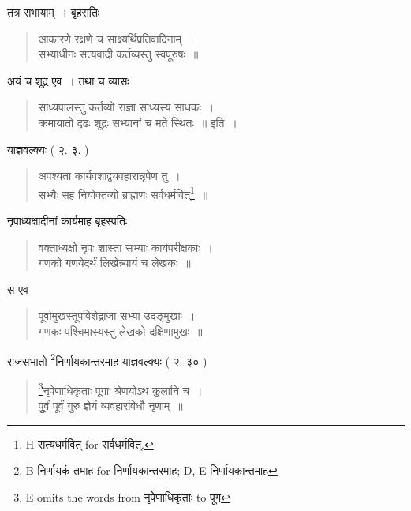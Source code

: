 \documentclass[11pt, openany]{book}
\begin{document}
तत्र सभायाम्~। बृहसतिः

\vspace{-2mm}
\begin{quote}
{\vy आकारणे रक्षणे च साक्ष्यर्थिप्रतिवादिनाम्~।\\
सभ्याधीनः सत्यवादी कर्तव्यस्तु स्वपूरुषः~॥}
\end{quote}

\newpage
{}

अयं च शूद्र एव~। तथा च व्यासः 

\vspace{-2mm}
\begin{quote}
{\vy साध्यपालस्तु कर्तव्यो राज्ञा साध्यस्य साधकः~।\\
क्रमायातो दृढः शूद्रः सभ्यानां च मते स्थितः~॥} इति~।
\end{quote}

याज्ञवल्क्यः ( २. ३. )

\vspace{-2mm}
\begin{quote}
{\vy अपश्यता कार्यवशाद्व्यवहारान्नृपेण तु~।\\
सभ्यैः सह नियोक्तव्यो ब्राह्मणः सर्वधर्मवित्\renewcommand{\thefootnote}{1}\footnote{H सत्यधर्मवित् for सर्वधर्मवित्.}~॥}
\end{quote}

नृपाध्यक्षादीनां कार्यमाह बृहस्पतिः 

\vspace{-2mm}
\begin{quote}
{\vy वक्ताध्यक्षो नृपः शास्ता सभ्याः कार्यपरीक्षकाः~।\\
गणको गणयेदर्थं लिखेन्न्यायं च लेखकः~॥}
\end{quote}

स एव

\vspace{-2mm}
\begin{quote}
{\vy पूर्वामुखस्तूपविशेद्राजा सभ्या उदङ्मुखाः~।\\
गणकः पश्चिमास्यस्तु लेखको दक्षिणामुखः~॥}
\end{quote}

राजसभातो \renewcommand{\thefootnote}{2}\footnote{B निर्णायकं तमाह for निर्णायकान्तरमाह; D, E निर्णायकान्तमाह}निर्णायकान्तरमाह याज्ञवल्क्यः ( २. ३० )

\vspace{-2mm}
\begin{quote}
{\vy \renewcommand{\thefootnote}{3}\footnote{E omits the words from नृपेणाधिकृताः to पूग}नृपेणाधिकृताः पूगाः श्रेणयोऽथ कुलानि च~।\\
पुुूर्वं पूर्वं गुरु ज्ञेयं व्यवहारविधौ नृणाम्~॥}
\end{quote}
\end{document}
